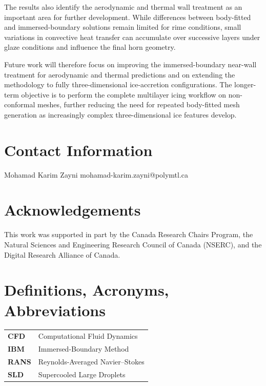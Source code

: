 \documentclass[letterpaper,times]{sae}
\begin{document}
The results also identify the aerodynamic and thermal wall treatment as an
important area for further development. While differences between
body-fitted and immersed-boundary solutions remain limited for rime
conditions, small variations in convective heat transfer can accumulate over
successive layers under glaze conditions and influence the final horn
geometry.

Future work will therefore focus on improving the immersed-boundary
near-wall treatment for aerodynamic and thermal predictions and on extending
the methodology to fully three-dimensional ice-accretion configurations.
The longer-term objective is to perform the complete multilayer icing
workflow on non-conformal meshes, further reducing the need for repeated
body-fitted mesh generation as increasingly complex three-dimensional ice
features develop.




\section{Contact Information}
Mohamad Karim Zayni\newline
mohamad-karim.zayni@polymtl.ca


\section{Acknowledgements}

This work was supported in part by the Canada Research Chairs Program,
the Natural Sciences and Engineering Research Council of Canada (NSERC),
and the Digital Research Alliance of Canada.



\section{Definitions, Acronyms, Abbreviations}

\begin{table}[h]
\centering
\begin{tabular}{L{0.12\textwidth} L{0.35\textwidth}}
\textbf{CFD}  & Computational Fluid Dynamics \\
\textbf{IBM}  & Immersed-Boundary Method \\
\textbf{RANS} & Reynolds-Averaged Navier--Stokes \\
\textbf{SLD}  & Supercooled Large Droplets \\
\end{tabular}
\end{table}
\end{document}

